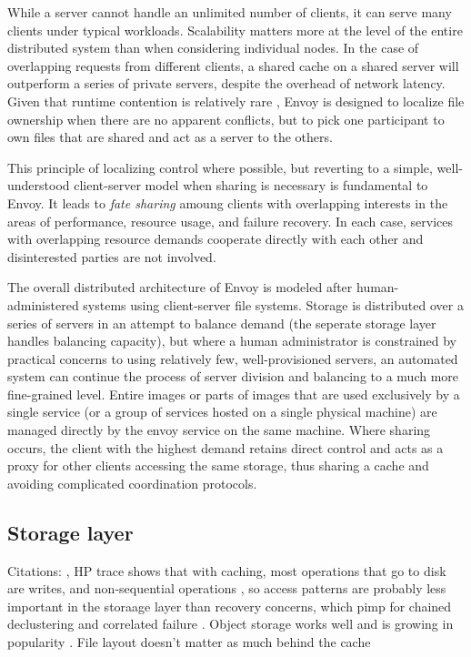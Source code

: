 While a server cannot handle an unlimited number of clients, it can serve many clients under typical workloads. Scalability matters more at the level of the entire distributed system than when considering individual nodes. In the case of overlapping requests from different clients, a shared cache on a shared server will outperform a series of private servers, despite the overhead of network latency. Given that runtime contention is relatively rare \cite{kistler}, Envoy is designed to localize file ownership when there are no apparent conflicts, but to pick one participant to own files that are shared and act as a server to the others.

This principle of localizing control where possible, but reverting to a simple, well-understood client-server model when sharing is necessary is fundamental to Envoy. It leads to \emph{fate sharing} amoung clients with overlapping interests in the areas of performance, resource usage, and failure recovery. In each case, services with overlapping resource demands cooperate directly with each other and disinterested parties are not involved.

The overall distributed architecture of Envoy is modeled after human-administered systems using client-server file systems. Storage is distributed over a series of servers in an attempt to balance demand (the seperate storage layer handles balancing capacity), but where a human administrator is constrained by practical concerns to using relatively few, well-provisioned servers, an automated system can continue the process of server division and balancing to a much more fine-grained level. Entire images or parts of images that are used exclusively by a single service (or a group of services hosted on a single physical machine) are managed directly by the envoy service on the same machine. Where sharing occurs, the client with the highest demand retains direct control and acts as a proxy for other clients accessing the same storage, thus sharing a cache and avoiding complicated coordination protocols.

\subsection{Storage layer}

Citations: \cite{stein05}, HP trace shows that with caching, most operations that go to disk are writes, and non-sequential operations \cite{ruemmler}, so access patterns are probably less important in the storaage layer than recovery concerns, which pimp for chained declustering and correlated failure \cite{lee96}. Object storage works well and is growing in popularity \cite{factor}. File layout doesn't matter as much behind the cache \cite{stein05}

